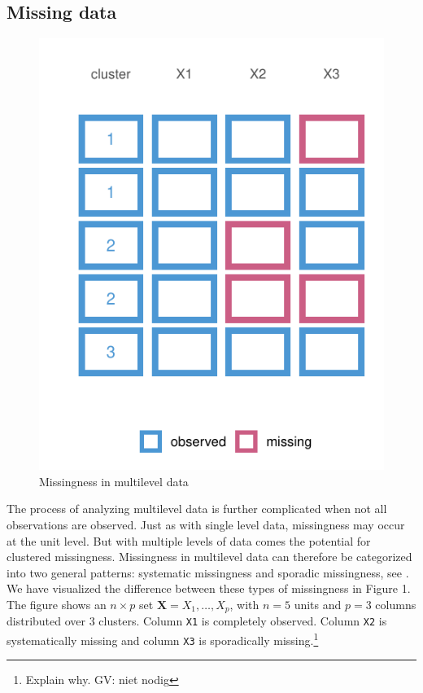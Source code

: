 \documentclass[
]{jss}
\begin{document}
\hypertarget{missing-data}{%
\subsection{Missing data}\label{missing-data}}

\begin{CodeChunk}
\begin{figure}

{\centering \includegraphics{Manuscript_files/figure-latex/patterns-1} 

}

\caption[Missingness in multilevel data]{Missingness in multilevel data}\label{fig:patterns}
\end{figure}
\end{CodeChunk}

The process of analyzing multilevel data is further complicated when not
all observations are observed. Just as with single level data,
missingness may occur at the unit level. But with multiple levels of
data comes the potential for clustered missingness. Missingness in
multilevel data can therefore be categorized into two general patterns:
systematic missingness and sporadic missingness, see \citet{resc13}. We
have visualized the difference between these types of missingness in
Figure 1. The figure shows an \(n \times p\) set
\(\mathbf{X} = X_1, \dots, X_p\), with \(n=5\) units and \(p=3\) columns
distributed over 3 clusters. Column \texttt{X1} is completely observed.
Column \texttt{X2} is systematically missing and column \texttt{X3} is
sporadically missing.\footnote{Explain why. GV: niet nodig}
\end{document}
